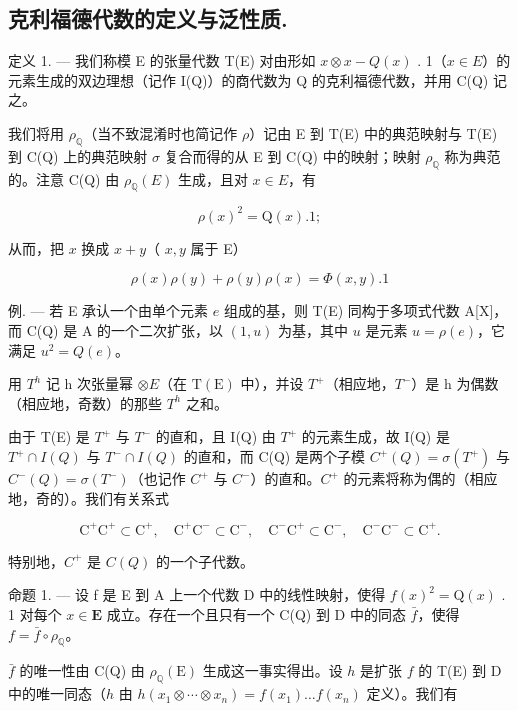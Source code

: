 \subsection{克利福德代数的定义与泛性质.}

定义 1. --- 我们称模 E 的张量代数 T(E) 对由形如 \(x \otimes x - Q(x)\) . 1（\(x \in E\)）的元素生成的双边理想（记作 I(Q)）的商代数为 Q 的克利福德代数，并用 C(Q) 记之。

  我们将用 \(\rho_{\mathbb{Q}}\)（当不致混淆时也简记作 \(\rho\)）记由 E 到 T(E) 中的典范映射与 T(E) 到 C(Q) 上的典范映射 \(\sigma\) 复合而得的从 E 到 C(Q) 中的映射；映射 \(\rho_{\mathbb{Q}}\) 称为典范的。注意 C(Q) 由 \(\rho_{\mathbb{Q}}(E)\) 生成，且对 \(x \in E\)，有

\[
\rho (x) ^ {2} = \mathrm{Q} (x). 1;\tag{1}
\]

从而，把 \(x\) 换成 \(x + y\)（ \(x, y\) 属于 E）

\[
\rho (x) \rho (y) + \rho (y) \rho (x) = \Phi (x, y). 1\tag{2}
\]

例. --- 若 E 承认一个由单个元素 \(e\) 组成的基，则 T(E) 同构于多项式代数 A{[}X{]}，而 C(Q) 是 A 的一个二次扩张，以 \((1, u)\) 为基，其中 \(u\) 是元素 \(u = \rho(e)\)，它满足 \(u^2 = Q(e)\)。

  用 \(T^{h}\) 记 h 次张量幂 \(\otimes E\)（在 \(\mathrm{T}(\mathrm{E})\) 中），并设 \(T^{+}\)（相应地，\(T^{-}\)）是 h 为偶数（相应地，奇数）的那些 \(T^{h}\) 之和。

  由于 T(E) 是 \(T^{+}\) 与 \(T^{-}\) 的直和，且 I(Q) 由 \(T^{+}\) 的元素生成，故 I(Q) 是 \(T^{+} \cap I(Q)\) 与 \(T^{-} \cap I(Q)\) 的直和，而 C(Q) 是两个子模 \(C^{+}(Q) = \sigma(T^{+})\) 与 \(C^{-}(Q) = \sigma(T^{-})\)（也记作 \(C^{+}\) 与 \(C^{-}\)）的直和。\(C^{+}\) 的元素将称为偶的（相应地，奇的）。我们有关系式

\[
\mathrm{C} ^ {+} \mathrm{C} ^ {+} \subset \mathrm{C} ^ {+}, \quad \mathrm{C} ^ {+} \mathrm{C} ^ {-} \subset \mathrm{C} ^ {-}, \quad \mathrm{C} ^ {-} \mathrm{C} ^ {+} \subset \mathrm{C} ^ {-}, \quad \mathrm{C} ^ {-} \mathrm{C} ^ {-} \subset \mathrm{C} ^ {+}.\tag{3}
\]

  特别地，\(C^{+}\) 是 \(C(Q)\) 的一个子代数。

命题 1. --- 设 f 是 E 到 A 上一个代数 D 中的线性映射，使得 \(f(x)^{2} = \mathrm{Q}(x)\) . 1 对每个 \(x \in \mathbf{E}\) 成立。存在一个且只有一个 C(Q) 到 D 中的同态 \(\bar{f}\)，使得 \(f = \bar{f} \circ \rho_{\mathbb{Q}}\)。

  \(\bar{f}\) 的唯一性由 C(Q) 由 \(\rho_{\mathbb{Q}}(\mathrm{E})\) 生成这一事实得出。设 \(h\) 是扩张 \(f\) 的 T(E) 到 D 中的唯一同态（\(h\) 由 \(h(x_1 \otimes \cdots \otimes x_n) = f(x_1) \ldots f(x_n)\) 定义）。我们有

